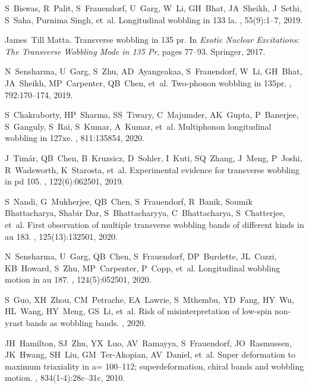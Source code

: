 \documentclass[11pt]{article}
\begin{document}
\begin{thebibliography}{99}
S~Biswas, R~Palit, S~Frauendorf, U~Garg, W~Li, GH~Bhat, JA~Sheikh, J~Sethi,
  S~Saha, Purnima Singh, et~al.
\newblock Longitudinal wobbling in 133 la.
, 55(9):1--7, 2019.

James~Till Matta.
\newblock Transverse wobbling in 135 pr.
\newblock In {\em Exotic Nuclear Excitations: The Transverse Wobbling Mode in
  135 Pr}, pages 77--93. Springer, 2017.

N~Sensharma, U~Garg, S~Zhu, AD~Ayangeakaa, S~Frauendorf, W~Li, GH~Bhat,
  JA~Sheikh, MP~Carpenter, QB~Chen, et~al.
\newblock Two-phonon wobbling in 135pr.
, 792:170--174, 2019.

S~Chakraborty, HP~Sharma, SS~Tiwary, C~Majumder, AK~Gupta, P~Banerjee,
  S~Ganguly, S~Rai, S~Kumar, A~Kumar, et~al.
\newblock Multiphonon longitudinal wobbling in 127xe.
, 811:135854, 2020.

J~Tim{\'a}r, QB~Chen, B~Kruzsicz, D~Sohler, I~Kuti, SQ~Zhang, J~Meng, P~Joshi,
  R~Wadsworth, K~Starosta, et~al.
\newblock Experimental evidence for transverse wobbling in pd 105.
, 122(6):062501, 2019.

S~Nandi, G~Mukherjee, QB~Chen, S~Frauendorf, R~Banik, Soumik Bhattacharya,
  Shabir Dar, S~Bhattacharyya, C~Bhattacharya, S~Chatterjee, et~al.
\newblock First observation of multiple transverse wobbling bands of different
  kinds in au 183.
, 125(13):132501, 2020.

N~Sensharma, U~Garg, QB~Chen, S~Frauendorf, DP~Burdette, JL~Cozzi, KB~Howard,
  S~Zhu, MP~Carpenter, P~Copp, et~al.
\newblock Longitudinal wobbling motion in au 187.
, 124(5):052501, 2020.

S~Guo, XH~Zhou, CM~Petrache, EA~Lawrie, S~Mthembu, YD~Fang, HY~Wu, HL~Wang,
  HY~Meng, GS~Li, et~al.
\newblock Risk of misinterpretation of low-spin non-yrast bands as wobbling
  bands.
, 2020.

JH~Hamilton, SJ~Zhu, YX~Luo, AV~Ramayya, S~Frauendorf, JO~Rasmussen, JK~Hwang,
  SH~Liu, GM~Ter-Akopian, AV~Daniel, et~al.
\newblock Super deformation to maximum triaxiality in a= 100--112;
  superdeformation, chiral bands and wobbling motion.
, 834(1-4):28c--31c, 2010.


\end{thebibliography}
\end{document}

